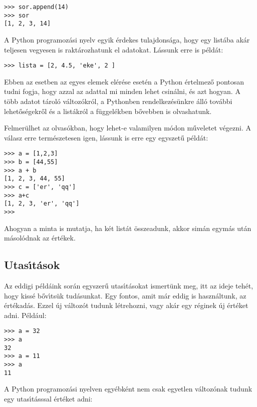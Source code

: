 \documentclass[12pt]{article}
\newcounter{minta}[section]
\begin{document}
\begin{Verbatim}[fontsize=\small]
>>> sor.append(14)
>>> sor
[1, 2, 3, 14]
\end{Verbatim}

\noindent A Python programoz\'asi nyelv egyik \'erdekes tulajdons\'aga, hogy egy list\'aba ak\'ar teljesen vegyesen 
is rakt\'arozhatunk el adatokat. L\'assunk erre is p\'eld\'at:

\begin{Verbatim}[fontsize=\small]
>>> lista = [2, 4.5, 'eke', 2 ]
\end{Verbatim}

\noindent Ebben az esetben az egyes elemek el\'er\'ese eset\'en a Python \'ertelmez\H{o} pontosan tudni fogja, hogy 
azzal az adattal mi minden lehet csin\'alni, \'es azt hogyan. A t\"obb adatot t\'arol\'o v\'altoz\'okr\'ol, 
a Pythonben rendelkez\'es\"unkre \'all\'o tov\'abbi lehet\H{o}s\'egekr\H{o}l \'es a list\'akr\'ol a 
f\"uggel\'ekben b\H{o}vebben is olvashatunk.

Felmer\"ulhet az olvas\'okban, hogy lehet-e valamilyen m\'odon m\H{u}veletet v\'egezni. A v\'alasz erre 
term\'eszetesen igen, l\'assunk is erre egy egyszet\H{u} p\'eld\'at:

\begin{Verbatim}[fontsize=\small]
>>> a = [1,2,3]
>>> b = [44,55]
>>> a + b
[1, 2, 3, 44, 55]
>>> c = ['er', 'qq']
>>> a+c
[1, 2, 3, 'er', 'qq']
>>>
\end{Verbatim}

Ahogyan a minta is mutatja, ha k\'et list\'at \"osszeadunk, akkor sim\'an egym\'as ut\'an m\'asol\'odnak 
az \'ert\'ekek.

\subsection{Utas\'{\i}t\'asok}

Az eddigi p\'eld\'aink sor\'an egyszer\H{u} utas\'{\i}t\'asokat ismert\"unk meg, itt az ideje teh\'et, hogy 
kiss\'e b\H{o}v\'{\i}ts\"uk tud\'asunkat. Egy fontos, amit m\'ar eddig is haszn\'altunk, az \'ert\'ekad\'as. 
Ezzel \'uj v\'altoz\'ot tudunk l\'etrehozni, vagy ak\'ar egy r\'eginek \'uj \'ert\'eket adni. P\'eld\'aul:

\begin{Verbatim}[fontsize=\small]
>>> a = 32
>>> a
32
>>> a = 11
>>> a
11
\end{Verbatim}

A Python programoz\'asi nyelven egy\'ebk\'ent nem csak egyetlen v\'altoz\'onak tudunk egy utas\'{\i}t\'asssal 
\'ert\'eket adni:
\end{document}
